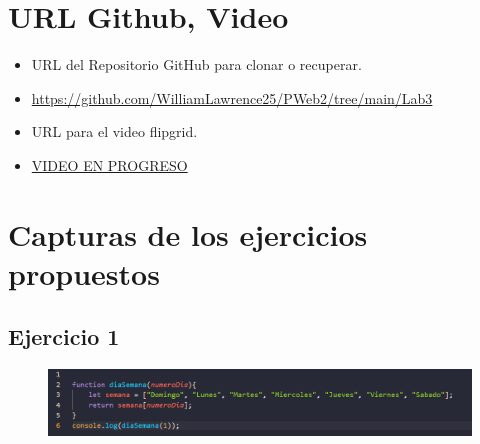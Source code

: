 \documentclass{article}
\begin{document}
	\section{URL Github, Video}
	\begin{itemize}
		\item URL del Repositorio GitHub para clonar o recuperar.
		\item \url{https://github.com/WilliamLawrence25/PWeb2/tree/main/Lab3}
		\item URL para el video flipgrid.
		\item \url{VIDEO EN PROGRESO}	
	\end{itemize}
	\clearpage	
	
	\section{Capturas de los ejercicios propuestos}
	
	\subsection{Ejercicio 1}
	\begin{figure}[H]
		\centering
		\includegraphics[width=1.0\textwidth, keepaspectratio]{img/ejercicio1b}
	\end{figure}
	
\end{document}
